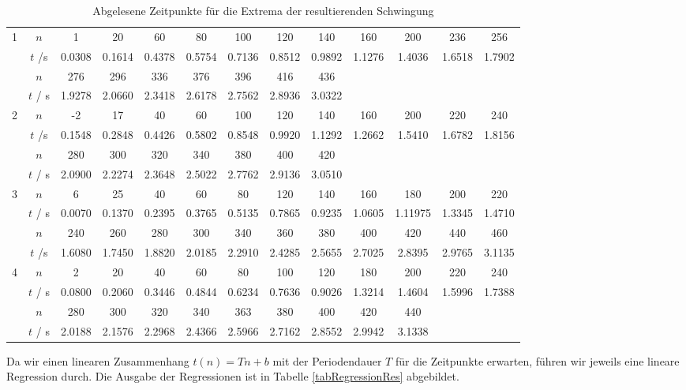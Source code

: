 \begin{table}[H]
\centering

\begin{adjustbox}{width=\textwidth}
\begin{tabular}{c|c|ccccccccccc}
\multirow{4}{*}{1} 
& $n$ & 1 & 20 & 60 & 80 & 100 & 120 & 140 & 160 & 200 & 236 & 256 \\
\cline{2-13}
& $t$ /s & 0.0308 & 0.1614 & 0.4378 & 0.5754 & 0.7136 & 0.8512 & 0.9892 & 1.1276 & 1.4036 & 1.6518 & 1.7902 \\
\cline{2-13}
& $n$ & 276 & 296 & 336 & 376 & 396 & 416 & 436 & & & & \\
\cline{2-13}
& $t$ / s & 1.9278 & 2.0660 & 2.3418 & 2.6178 & 2.7562 & 2.8936 & 3.0322 & & & & \\
\hline
\multirow{4}{*}{2} 
& $n$ & -2 & 17 & 40 & 60 & 100 & 120 & 140 & 160 & 200 & 220 & 240 \\
\cline{2-13}
& $t$ /s & 0.1548 & 0.2848 & 0.4426 & 0.5802 & 0.8548 & 0.9920 & 1.1292 & 1.2662 & 1.5410 & 1.6782 & 1.8156  \\
\cline{2-13}
& $n$ & 280 & 300 & 320 & 340 & 380 & 400 & 420 & & & & \\
\cline{2-13}
& $t$ / s & 2.0900 & 2.2274 & 2.3648 & 2.5022 & 2.7762 & 2.9136 & 3.0510 & & & &  \\
\hline
\multirow{4}{*}{3}
& $n$ & 6 & 25 & 40 & 60 & 80 & 120 & 140 & 160 & 180 & 200 & 220 \\
\cline{2-13}
& $t$ / s & 0.0070 & 0.1370 & 0.2395 & 0.3765 & 0.5135 & 0.7865 & 0.9235 & 1.0605 & 1.11975 & 1.3345 & 1.4710 \\
\cline{2-13}
& $n$ & 240 & 260 & 280 & 300 & 340 & 360 & 380 & 400 & 420 & 440 & 460 \\
\cline{2-13}
& $t$ /s & 1.6080 & 1.7450 & 1.8820 & 2.0185 & 2.2910 & 2.4285 & 2.5655 & 2.7025 & 2.8395 & 2.9765 & 3.1135 \\
\hline
\multirow{4}{*}{4}
& $n$ & 2 & 20 & 40 & 60 & 80 & 100 & 120 & 180 & 200 & 220 & 240 \\
\cline{2-13}
& $t$ / s & 0.0800 & 0.2060 & 0.3446 & 0.4844 & 0.6234 & 0.7636 & 0.9026 & 1.3214 & 1.4604 & 1.5996 & 1.7388 \\
\cline{2-13}
& $n$ & 280 & 300 & 320 & 340 & 363 & 380 & 400 & 420 & 440 & & \\
\cline{2-13}
& $t$ / s & 2.0188 & 2.1576 & 2.2968 & 2.4366 & 2.5966 & 2.7162 & 2.8552 & 2.9942 & 3.1338 & & 
\end{tabular}
\end{adjustbox}
\caption{Abgelesene Zeitpunkte für die Extrema der resultierenden Schwingung}
\label{tabTimeRes}
\end{table}
Da wir einen linearen Zusammenhang $t(n) = Tn+b$ mit der Periodendauer $T$ für die Zeitpunkte erwarten, führen wir jeweils eine lineare Regression durch. Die Ausgabe der Regressionen ist in Tabelle \ref{tabRegressionRes} abgebildet. 

